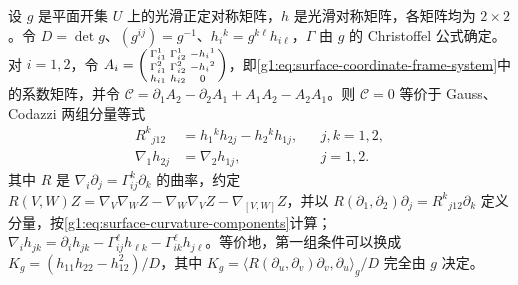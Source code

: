 \begin{proposition}
	\label{g1:prop:surface-data-flatness}
	设 \(g\) 是平面开集 \(U\) 上的光滑正定对称矩阵，\(h\) 是光滑对称矩阵，各矩阵均为 \(2\times2\)。令 \(D=\det g\)、\((g^{ij})=g^{-1}\)、\(h_i{}^k=g^{k\ell}h_{i\ell}\)，\(\Gamma\) 由 \(g\) 的 Christoffel 公式确定。对 \(i=1,2\)，令 \(A_i=\begin{psmallmatrix}\Gamma^1_{i1}&\Gamma^1_{i2}&-h_i{}^1\\\Gamma^2_{i1}&\Gamma^2_{i2}&-h_i{}^2\\h_{i1}&h_{i2}&0\end{psmallmatrix}\)，即\eqref{g1:eq:surface-coordinate-frame-system}中的系数矩阵，并令 \(\mathcal C=\partial_1A_2-\partial_2A_1+A_1A_2-A_2A_1\)。则 \(\mathcal C=0\) 等价于 Gauss、Codazzi 两组分量等式
	\begin{align}
		\label{g1:eq:surface-data-gauss}
		R^k{}_{j12}&=h_1{}^kh_{2j}-h_2{}^kh_{1j},&&j,k=1,2,\\
		\label{g1:eq:surface-data-codazzi}
		\nabla_1h_{2j}&=\nabla_2h_{1j},&&j=1,2.
	\end{align}
	其中 \(R\) 是 \(\nabla_i\partial_j=\Gamma^k_{ij}\partial_k\) 的曲率，约定 \(R(V,W)Z=\nabla_V\nabla_WZ-\nabla_W\nabla_VZ-\nabla_{[V,W]}Z\)，并以 \(R(\partial_1,\partial_2)\partial_j=R^k{}_{j12}\partial_k\) 定义分量，按\eqref{g1:eq:surface-curvature-components}计算；\(\nabla_i h_{jk}=\partial_i h_{jk}-\Gamma^\ell_{ij}h_{\ell k}-\Gamma^\ell_{ik}h_{j\ell}\)。等价地，第一组条件可以换成 \(K_g=(h_{11}h_{22}-h_{12}^2)/D\)，其中 \(K_g=\langle R(\partial_u,\partial_v)\partial_v,\partial_u\rangle_g/D\) 完全由 \(g\) 决定。
\end{proposition}

